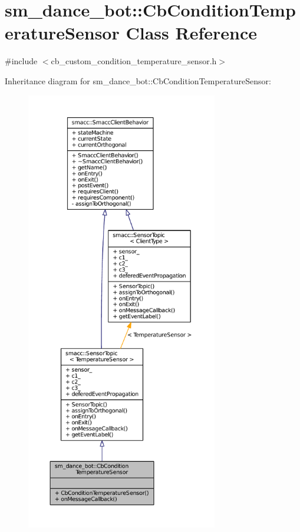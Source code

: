 \hypertarget{classsm__dance__bot_1_1CbConditionTemperatureSensor}{}\section{sm\+\_\+dance\+\_\+bot\+:\+:Cb\+Condition\+Temperature\+Sensor Class Reference}
\label{classsm__dance__bot_1_1CbConditionTemperatureSensor}


{\ttfamily \#include $<$cb\+\_\+custom\+\_\+condition\+\_\+temperature\+\_\+sensor.\+h$>$}



Inheritance diagram for sm\+\_\+dance\+\_\+bot\+:\+:Cb\+Condition\+Temperature\+Sensor\+:
\nopagebreak
\begin{figure}[H]
\begin{center}
\leavevmode
\includegraphics[height=550pt]{classsm__dance__bot_1_1CbConditionTemperatureSensor__inherit__graph}
\end{center}
\end{figure}


